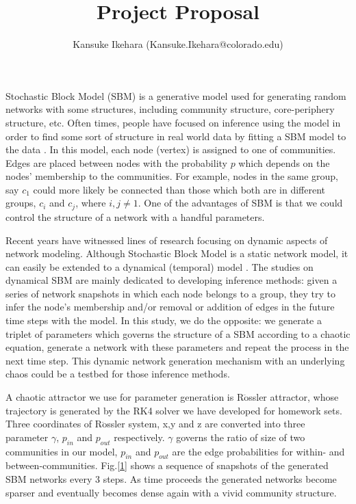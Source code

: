 \documentclass{article}
\title{Project Proposal}
\author{Kansuke Ikehara (Kansuke.Ikehara@colorado.edu)}
\begin{document}
\maketitle
Stochastic Block Model (SBM) is a generative model used for generating random networks with some structures, including community structure, core-periphery structure, etc. Often times, people have focused on inference using the model in order to find some sort of structure in real world data by fitting a SBM model to the data \cite{SBM, SBM_CorePeriphery}. In this model, each node (vertex) is assigned to one of communities. Edges are placed between nodes with the probability $p$ which depends on the nodes' membership to the communities. For example, nodes in the same group, say $c_{1}$ could more likely be connected than those which both are in different groups, $c_{i}$ and $c_{j}$, where $i,j \neq 1$. One of the advantages of SBM is that we could control the structure of a network with a handful parameters. 

Recent years have witnessed lines of research focusing on dynamic aspects of network modeling. Although Stochastic Block Model is a static network model, it can easily be extended to a dynamical (temporal) model \cite{DynamicalSBM,SBTM}. The studies on dynamical SBM are mainly dedicated to developing inference methods: given a series of network snapshots in which each node belongs to a group, they try to infer the node's membership and/or removal or addition of edges in the future time steps with the model. In this study, we do the opposite: we generate a triplet of parameters which governs the structure of a SBM according to a chaotic equation, generate a network with these parameters and repeat the process in the next time step. This dynamic network generation mechanism with an underlying chaos could be a testbed for those inference methods. 

A chaotic attractor we use for parameter generation is R$\ddot{\text{o}}$ssler attractor, whose trajectory is generated by the RK4 solver we have developed for homework sets. Three coordinates of R$\ddot{\text{o}}$ssler system, x,y and z are converted into three parameter $\gamma$, $p_{in}$ and $p_{out}$ respectively. $\gamma$ governs the ratio of size of two communities in our model, $p_{in}$ and $p_{out}$ are the edge probabilities for within- and between-communities. Fig.\ref{1} shows a sequence of snapshots of the generated SBM networks every 3 steps. As time proceeds the generated networks become sparser and eventually becomes dense again with a vivid community structure.
\end{document}
